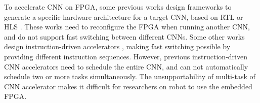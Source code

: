 To accelerate CNN on FPGA, some previous works design frameworks to generate a specific hardware architecture for a target CNN, based on  RTL \cite{li_high_2016} or HLS \cite{lu_evaluating_2017}. These works need to reconfigure the FPGA when running another CNN, and do not support fast switching between different CNNs. Some other works design instruction-driven accelerators \cite{yu2018instruction,qiu2016going}, making fast switching possible by providing different instruction sequences. However, previous instruction-driven CNN accelerators need to schedule the entire CNN, and can not automatically schedule two or more tasks simultaneously. The unsupportability of multi-task of CNN accelerator makes it difficult for researchers on robot to use the embedded FPGA.